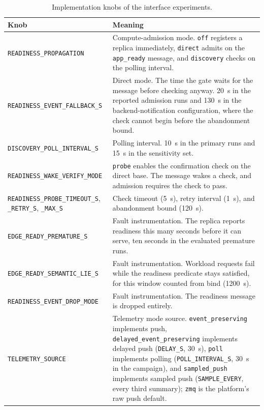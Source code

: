 ﻿\documentclass[12pt,reqno,twoside]{amsbook}
\begin{document}
{\begin{table}[H]
    \centering
    \caption{Implementation knobs of the interface experiments.}
    \label{tab:app_config_knobs}
    \footnotesize
    \begin{tabular}{p{} p{}}
        \toprule
        Knob & Meaning \\
        \midrule
        \texttt{READINESS\_PROPAGATION} & Compute-admission mode. \texttt{off} registers a replica immediately, \texttt{direct} admits on the \texttt{app\_ready} message, and \texttt{discovery} checks on the polling interval. \\
        \texttt{READINESS\_EVENT\_FALLBACK\_S} & Direct mode. The time the gate waits for the message before checking anyway. 20~s in the reported admission runs and 130~s in the backend-notification configuration, where the check cannot begin before the abandonment bound. \\
        \texttt{DISCOVERY\_POLL\_INTERVAL\_S} & Polling interval. 10~s in the primary runs and 15~s in the sensitivity set. \\
        \texttt{READINESS\_WAKE\_VERIFY\_MODE} & \texttt{probe} enables the confirmation check on the direct base. The message wakes a check, and admission requires the check to pass. \\
        \texttt{READINESS\_PROBE\_TIMEOUT\_S}, \texttt{\_RETRY\_S}, \texttt{\_MAX\_S} & Check timeout (5~s), retry interval (1~s), and abandonment bound (120~s). \\
        \texttt{EDGE\_READY\_PREMATURE\_S} & Fault instrumentation. The replica reports readiness this many seconds before it can serve, ten seconds in the evaluated premature runs. \\
        \texttt{EDGE\_READY\_SEMANTIC\_LIE\_S} & Fault instrumentation. Workload requests fail while the readiness predicate stays satisfied, for this window counted from bind (1200~s). \\
        \texttt{READINESS\_EVENT\_DROP\_MODE} & Fault instrumentation. The readiness message is dropped entirely. \\
        \texttt{TELEMETRY\_SOURCE} & Telemetry mode source. \texttt{event\_preserving} implements push, \texttt{delayed\_event\_preserving} implements delayed push (\texttt{DELAY\_S}, 30~s), \texttt{poll} implements polling (\texttt{POLL\_INTERVAL\_S}, 30~s in the campaign), and \texttt{sampled\_push} implements sampled push (\texttt{SAMPLE\_EVERY}, every third summary); \texttt{zmq} is the platform's raw push default. \\

\end{tabular}
\end{table}}
\end{document}

